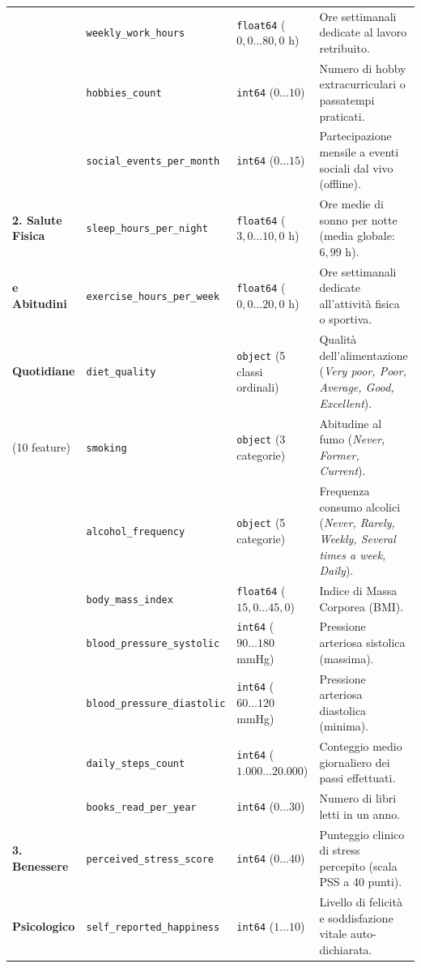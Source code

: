 \begin{table}[H]
{\begin{tabular}{llp{4.2cm}p{6.8cm}}
 & \texttt{weekly\_work\_hours} & \texttt{float64} ($0,0 \dots 80,0$ h) & Ore settimanali dedicate al lavoro retribuito. \\
 & \texttt{hobbies\_count} & \texttt{int64} ($0 \dots 10$) & Numero di hobby extracurriculari o passatempi praticati. \\
 & \texttt{social\_events\_per\_month} & \texttt{int64} ($0 \dots 15$) & Partecipazione mensile a eventi sociali dal vivo (offline). \\
\midrule
\textbf{2. Salute Fisica} & \texttt{sleep\_hours\_per\_night} & \texttt{float64} ($3,0 \dots 10,0$ h) & Ore medie di sonno per notte (media globale: $6,99$ h). \\
\textbf{e Abitudini} & \texttt{exercise\_hours\_per\_week} & \texttt{float64} ($0,0 \dots 20,0$ h) & Ore settimanali dedicate all'attività fisica o sportiva. \\
\textbf{Quotidiane} & \texttt{diet\_quality} & \texttt{object} (5 classi ordinali) & Qualità dell'alimentazione (\emph{Very poor, Poor, Average, Good, Excellent}). \\
(10 feature) & \texttt{smoking} & \texttt{object} (3 categorie) & Abitudine al fumo (\emph{Never, Former, Current}). \\
 & \texttt{alcohol\_frequency} & \texttt{object} (5 categorie) & Frequenza consumo alcolici (\emph{Never, Rarely, Weekly, Several times a week, Daily}). \\
 & \texttt{body\_mass\_index} & \texttt{float64} ($15,0 \dots 45,0$) & Indice di Massa Corporea (BMI). \\
 & \texttt{blood\_pressure\_systolic} & \texttt{int64} ($90 \dots 180$ mmHg) & Pressione arteriosa sistolica (massima). \\
 & \texttt{blood\_pressure\_diastolic} & \texttt{int64} ($60 \dots 120$ mmHg) & Pressione arteriosa diastolica (minima). \\
 & \texttt{daily\_steps\_count} & \texttt{int64} ($1.000 \dots 20.000$) & Conteggio medio giornaliero dei passi effettuati. \\
 & \texttt{books\_read\_per\_year} & \texttt{int64} ($0 \dots 30$) & Numero di libri letti in un anno. \\
\midrule
\textbf{3. Benessere} & \texttt{perceived\_stress\_score} & \texttt{int64} ($0 \dots 40$) & Punteggio clinico di stress percepito (scala PSS a 40 punti). \\
\textbf{Psicologico} & \texttt{self\_reported\_happiness} & \texttt{int64} ($1 \dots 10$) & Livello di felicità e soddisfazione vitale auto-dichiarata. \\
\bottomrule
\end{tabular}%
}
\end{table}

